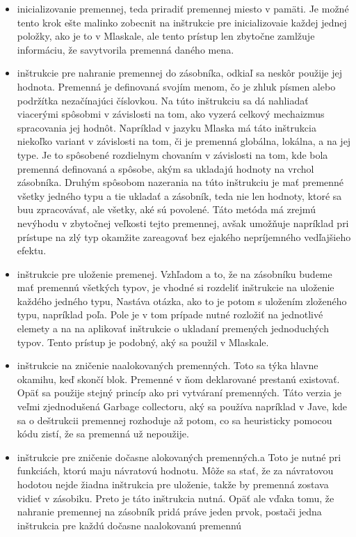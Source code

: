 \begin{itemize}
\item inicializovanie premennej, teda priradiť premennej miesto v pamäti. Je možné tento krok ešte malinko zobecnit na inštrukcie pre inicializovaie každej jednej položky, ako je to v Mlaskale, ale tento prístup len zbytočne zamlžuje informáciu, že savytvorila premenná daného mena.
\item inštrukcie pre nahranie premennej do zásobníka, odkiaľ sa neskôr použije jej hodnota. Premenná je definovaná svojím menom, čo je zhluk písmen alebo podržítka nezačínajúci číslovkou. Na túto inštrukciu sa dá nahliadať viacerými spôsobmi v závislosti na tom, ako vyzerá celkový mechaizmus spracovania jej hodnôt. Napríklad v jazyku Mlaska má táto inštrukcia niekoľko variant v závislosti na tom, či je premenná globálna, lokálna, a na jej type. Je to spôsobené rozdielnym chovaním v závislosti na tom, kde bola premenná definovaná a spôsobe, akým sa ukladajú hodnoty na vrchol zásobníka. Druhým spôsobom nazerania na túto inštrukciu je mať premenné všetky jedného typu a tie ukladať a zásobník, teda nie len hodnoty, ktoré sa buu zpracovávať, ale všetky, aké sú povolené. Táto metóda má zrejmú nevýhodu v zbytočnej veľkosti tejto premennej, avšak umožňuje napríklad pri prístupe na zlý typ okamžite zareagovať bez ejakého nepríjemného vedľajšieho efektu.
\item inštrukcie pre uloženie premenej. Vzhľadom a to, že na zásobníku budeme mať premennú všetkých typov, je vhodné si rozdeliť inštrukcie na uloženie každého jedného typu, Nastáva otázka, ako to je potom s uložením zloženého typu, napríklad poľa. Pole je v tom prípade nutné rozložiť na jednotlivé elemety a na na aplikovať inštrukcie o ukladaní premených jednoduchých typov. Tento prístup je podobný, aký sa použil v Mlaskale.
\item inštrukcie  na zničenie naalokovaných premenných. Toto sa týka hlavne okamihu, keď skončí blok. Premenné v ňom deklarované prestanú existovať. Opäť sa použije stejný princíp ako pri vytváraní premenných. Táto verzia je veľmi zjednodušená Garbage collectoru, aký sa používa napríklad v Jave, kde sa o deštrukcii premennej rozhoduje až potom, co sa heuristicky pomocou kódu zistí, že sa premenná už nepoužije.
\item inštrukcie pre zničenie dočasne alokovaných premenných.a Toto je nutné pri funkciách, ktorú maju návratovú hodnotu. Môže sa stať, že za návratovou hodotou nejde žiadna inštrukcia pre uloženie, takže by premenná zostava vidieť v zásobiku. Preto je táto inštrukcia nutná. Opäť ale vďaka tomu, že nahranie premennej na zásobník pridá práve jeden prvok, postači jedna inštrukcia pre každú dočasne naalokovanú premennú

\end{itemize}
